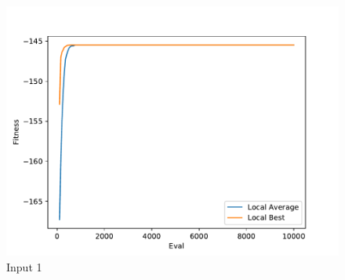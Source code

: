 \documentclass{standalone}
\begin{document}
\begin{figure}[!htb]
	\caption{Input 1}
	\label{fig:graph_1042}
	\includegraphics[width=\textwidth]{../graphs/graphs/1042.pdf}
\end{figure}
\end{document}
